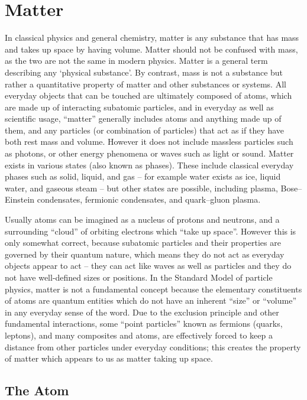 \hypertarget{matter}{%
\section{Matter}\label{matter}}

In classical physics and general chemistry, matter is any substance that has mass and takes up space by having volume. Matter should not be confused with mass, as the two are not the same in modern physics. Matter is a general term describing any `physical substance'. By contrast, mass is not a substance but rather a quantitative property of matter and other substances or systems. All everyday objects that can be touched are ultimately composed of atoms, which are made up of interacting subatomic particles, and in everyday as well as scientific usage, ``matter'' generally includes atoms and anything made up of them, and any particles (or combination of particles) that act as if they have both rest mass and volume. However it does not include massless particles such as photons, or other energy phenomena or waves such as light or sound. Matter exists in various states (also known as phases). These include classical everyday phases such as solid, liquid, and gas -- for example water exists as ice, liquid water, and gaseous steam -- but other states are possible, including plasma, Bose--Einstein condensates, fermionic condensates, and quark--gluon plasma.

Usually atoms can be imagined as a nucleus of protons and neutrons, and a surrounding ``cloud'' of orbiting electrons which ``take up space''. However this is only somewhat correct, because subatomic particles and their properties are governed by their quantum nature, which means they do not act as everyday objects appear to act -- they can act like waves as well as particles and they do not have well-defined sizes or positions. In the Standard Model of particle physics, matter is not a fundamental concept because the elementary constituents of atoms are quantum entities which do not have an inherent ``size'' or ``volume'' in any everyday sense of the word. Due to the exclusion principle and other fundamental interactions, some ``point particles'' known as fermions (quarks, leptons), and many composites and atoms, are effectively forced to keep a distance from other particles under everyday conditions; this creates the property of matter which appears to us as matter taking up space.

\hypertarget{the-atom}{%
\subsection{The Atom}\label{the-atom}}

